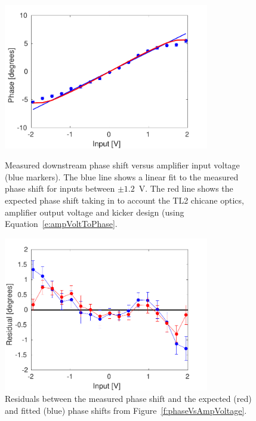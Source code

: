 \begin{figure}
  \centering
  \includegraphics[width=0.8\textwidth]{Figures/commissioning/phaseVsAmpVoltage}
  \caption{Measured downstream phase shift versus amplifier input voltage (blue markers). The blue line shows a linear fit to the measured phase shift for inputs between \(\pm1.2\)~V. The red line shows the expected phase shift taking in to account the TL2 chicane optics, amplifier output voltage and kicker design (using Equation~\ref{e:ampVoltToPhase}.}
  \label{f:phaseVsAmpVoltage}
  \includegraphics[width=0.8\textwidth]{Figures/commissioning/phaseVsAmpVoltage_residuals}
  \caption{Residuals between the measured phase shift and the expected (red) and fitted (blue) phase shifts from Figure~\ref{f:phaseVsAmpVoltage}.}
  \label{f:phaseVsAmp_resid}
\end{figure}

